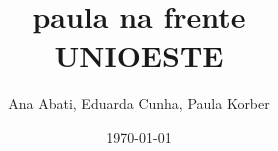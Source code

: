 \documentclass[11pt, a4paper, twoside]{article}
\title{paula na frente \\ UNIOESTE}
\author{Ana Abati, Eduarda Cunha, Paula Korber}
\begin{document}
\twocolumn
\date{\today}
\maketitle


\renewcommand{\contentsname}{Índice} %
\tableofcontents
\end{document}
